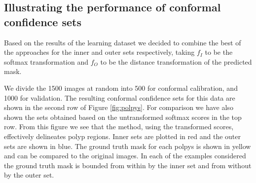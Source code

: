 
\subsection{Illustrating the performance of conformal confidence sets}\label{SS:val}
Based on the results of the learning dataset we decided to combine the best of the approaches for the inner and outer sets respectively, taking $f_I$ to be the softmax transformation and $f_O$ to be the distance transformation of the predicted mask.

We divide the 1500 images at random into 500 for conformal calibration, and 1000 for validation. The resulting conformal confidence sets for this data are shown in the second row of Figure \ref{fig:polpys}. For comparison we have also shown the sets obtained based on the untransformed softmax scores in the top row. From this figure we see that the method, using the transformed scores, effectively delineates polyp regions. Inner sets are plotted in red and the outer sets are shown in blue. The ground truth mask for each polpys is shown in yellow and can be compared to the original images. In each of the examples considered the ground truth mask is bounded from within by the inner set and from without by the outer set. 

